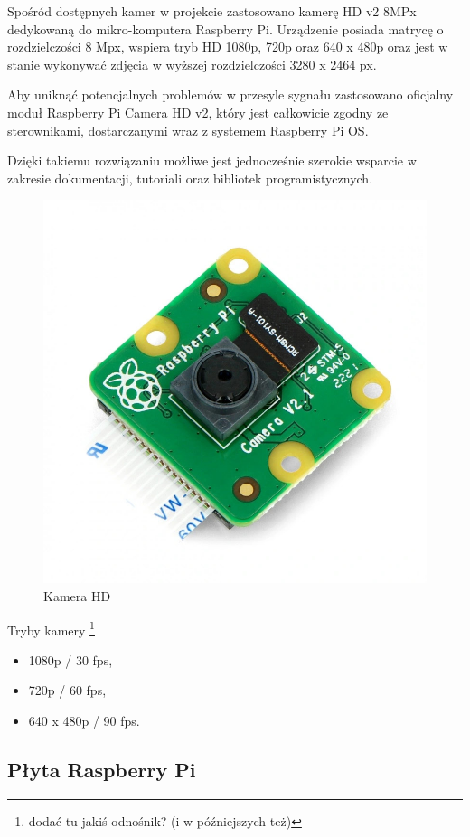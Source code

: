 \documentclass[a4paper,12pt,reqno]{article}
\begin{document}
Spośród dostępnych kamer w projekcie zastosowano kamerę  HD v2 8MPx dedykowaną do mikro-komputera Raspberry Pi. Urządzenie posiada matrycę o rozdzielczości 8 Mpx, wspiera tryb HD 1080p, 720p oraz 640 x 480p oraz jest w stanie wykonywać zdjęcia w wyższej rozdzielczości 3280 x 2464 px.

Aby uniknąć potencjalnych problemów w przesyle sygnału zastosowano oficjalny moduł Raspberry Pi Camera HD v2, który jest całkowicie zgodny ze sterownikami, dostarczanymi wraz z systemem Raspberry Pi OS.

Dzięki takiemu rozwiązaniu możliwe jest jednocześnie szerokie wsparcie w zakresie dokumentacji, tutoriali oraz bibliotek programistycznych.

\begin{figure}[H]%
\centering
\includegraphics[width=0.8\columnwidth]{imgs/camera.jpg}
\caption{Kamera HD \cite{img_cam} \label{kamera}}
\quad
\end{figure}

\textcolor{edited}{Tryby} kamery \footnote{dodać tu jakiś odnośnik? (i w późniejszych też)}

\begin{itemize}
	\item 1080p / 30 fps,
	\item 720p / 60 fps,
	\item 640 x 480p / 90 fps.
\end{itemize}

\subsection{Płyta Raspberry Pi}
\end{document}
